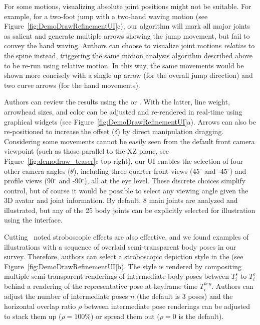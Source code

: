 For some motions, visualizing absolute joint positions might not be suitable.
For example, for a two-foot jump with a two-hand waving motion (see Figure~\ref{fig:DemoDrawRefinementUI}c), our algorithm will mark all major joints as salient and generate multiple arrows showing the jump movement, but fail to convey the hand waving.
%
Authors can choose to visualize joint motions \textit{relative} to the spine instead,
triggering the same motion analysis algorithm described above to be re-run using relative motion.
In this way, the same movements would be shown more concisely with a single up arrow (for the overall jump direction) and two curve arrows (for the hand movements).

Authors can review the results using the \phaseI{} or \phaseII{}. With the latter, line weight, arrowhead sizes, and color can be adjusted and re-rendered in real-time using graphical widgets (see Figure~\ref{fig:DemoDrawRefinementUI}a). Arrows can also be re-positioned to increase the offset ($\delta$) by direct manipulation dragging.
%
Considering some movements cannot be easily seen from the default front camera viewpoint (such as those parallel to the XZ plane, see Figure~\ref{fig:demodraw_teaser}c top-right), our UI enables the selection of four other camera angles ($\theta$), including three-quarter front views (45$^{\circ}$ and -45$^{\circ}$) and profile views (90$^{\circ}$ and -90$^{\circ}$), all at the eye level. These discrete choices simplify control, but of course it would be possible to select any viewing angle given the 3D avatar and joint information. By default, 8 main joints are analyzed and illustrated, but any of the 25 body joints can be explicitly selected for illustration using the interface.

Cutting~\cite{cutting_representing_2002} noted stroboscopic effects are also effective, and we found examples of illustrations with a sequence of overlaid semi-transparent body poses in our survey.
%
Therefore, authors can select a stroboscopic depiction style in the \phaseII{} (see Figure~\ref{fig:DemoDrawRefinementUI}b).
The style is rendered by compositing multiple semi-transparent renderings of intermediate body poses between $T_i^s$ to $T_i^e$ behind a rendering of the representative pose at keyframe time $T_i^{key}$.
Authors can adjust the number of intermediate poses $n$ (the default is 3 poses) and the horizontal overlap ratio $\rho$ between intermediate pose renderings can be adjusted to stack them up ($\rho=100\%$) or spread them out ($\rho=0$ is the default).

